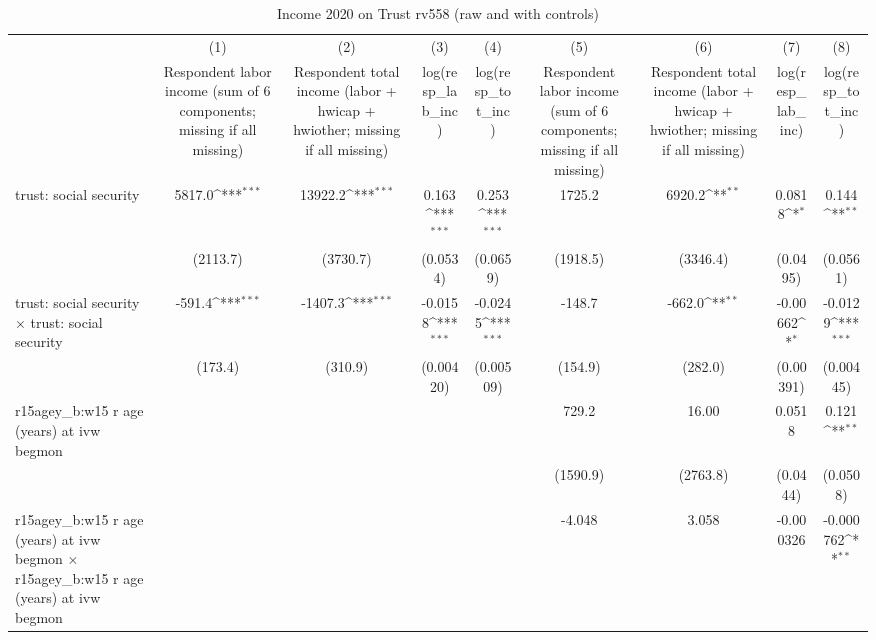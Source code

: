 \begin{table}[htbp]\centering
\def\sym#1{\ifmmode^{#1}\else\(^{#1}\)\fi}
\caption{Income 2020 on Trust rv558 (raw and with controls)}
\begin{tabular}{l*{8}{c}}
\toprule
                &\multicolumn{1}{c}{(1)}&\multicolumn{1}{c}{(2)}&\multicolumn{1}{c}{(3)}&\multicolumn{1}{c}{(4)}&\multicolumn{1}{c}{(5)}&\multicolumn{1}{c}{(6)}&\multicolumn{1}{c}{(7)}&\multicolumn{1}{c}{(8)}\\
                &\multicolumn{1}{c}{Respondent labor income (sum of 6 components; missing if all missing)}&\multicolumn{1}{c}{Respondent total income (labor + hwicap + hwiother; missing if all missing)}&\multicolumn{1}{c}{log(resp\_lab\_inc)}&\multicolumn{1}{c}{log(resp\_tot\_inc)}&\multicolumn{1}{c}{Respondent labor income (sum of 6 components; missing if all missing)}&\multicolumn{1}{c}{Respondent total income (labor + hwicap + hwiother; missing if all missing)}&\multicolumn{1}{c}{log(resp\_lab\_inc)}&\multicolumn{1}{c}{log(resp\_tot\_inc)}\\
\midrule
trust: social security&   5817.0\sym{***}&  13922.2\sym{***}&    0.163\sym{***}&    0.253\sym{***}&   1725.2         &   6920.2\sym{**} &   0.0818\sym{*}  &    0.144\sym{**} \\
                & (2113.7)         & (3730.7)         & (0.0534)         & (0.0659)         & (1918.5)         & (3346.4)         & (0.0495)         & (0.0561)         \\
\addlinespace
trust: social security $\times$ trust: social security&   -591.4\sym{***}&  -1407.3\sym{***}&  -0.0158\sym{***}&  -0.0245\sym{***}&   -148.7         &   -662.0\sym{**} & -0.00662\sym{*}  &  -0.0129\sym{***}\\
                &  (173.4)         &  (310.9)         &(0.00420)         &(0.00509)         &  (154.9)         &  (282.0)         &(0.00391)         &(0.00445)         \\
\addlinespace
r15agey\_b:w15 r age (years) at ivw begmon&                  &                  &                  &                  &    729.2         &    16.00         &   0.0518         &    0.121\sym{**} \\
                &                  &                  &                  &                  & (1590.9)         & (2763.8)         & (0.0444)         & (0.0508)         \\
\addlinespace
r15agey\_b:w15 r age (years) at ivw begmon $\times$ r15agey\_b:w15 r age (years) at ivw begmon&                  &                  &                  &                  &   -4.048         &    3.058         &-0.000326         &-0.000762\sym{**} \\

\end{tabular}
\end{table}
